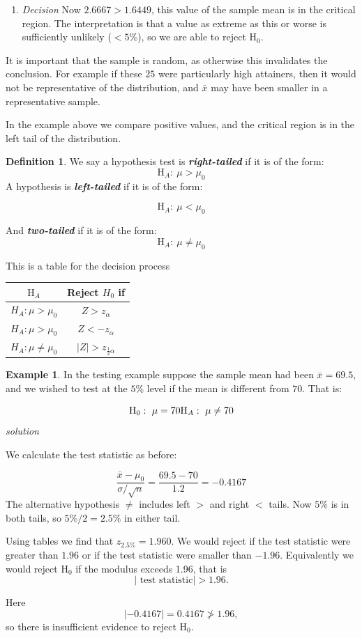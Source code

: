 \documentclass[
]{book}
\providecommand{\tightlist}{%
  \setlength{\itemsep}{0pt}\setlength{\parskip}{0pt}}
\theoremstyle{definition}
\newtheorem{definition}{Definition}[chapter]
\theoremstyle{definition}
\newtheorem{example}{Example}[chapter]
\theoremstyle{definition}
\theoremstyle{definition}
\theoremstyle{remark}
\begin{document}
\begin{enumerate}
\def\labelenumi{\arabic{enumi}.}
\setcounter{enumi}{2}
\tightlist
\item
  \emph{Decision}
  Now \(2.6667 > 1.6449\), this value of the sample mean is in the critical region. The interpretation is that a value as extreme as this or worse is sufficiently unlikely (\(<5\%\)), so we are able to reject \(\text{H}_{0}\).
\end{enumerate}

It is important that the sample is random, as otherwise this invalidates the conclusion. For example if these \(25\) were particularly high attainers, then it would not be representative of the distribution, and \(\bar{x}\) may have been smaller in a representative sample.

In the example above we compare positive values, and the critical region is in the left tail of the distribution.

\begin{definition}
We say a hypothesis test is \textbf{\emph{right-tailed}} if it is of the form:
\[\text{H}_A: \ \mu > \mu_0\]
A hypothesis is \textbf{\emph{left-tailed}} if it is of the form:

\[\text{H}_A: \ \mu < \mu_0\]

And \textbf{\emph{two-tailed}} if it is of the form:
\[\text{H}_A: \ \mu \neq \mu_0\]
\end{definition}

This is a table for the decision process

\begin{longtable}[]{@{}cc@{}}
\toprule
\(\text{H}_{A}\) & Reject \(H_{0}\) if\tabularnewline
\midrule
\endhead
\(H_{A}: \mu > \mu_0\) & \(Z>z_{\alpha}\)\tabularnewline
\(H_{A}: \mu > \mu_0\) & \(Z<-z_{\alpha}\)\tabularnewline
\(H_{A}: \mu \neq \mu_0\) & \(|Z|>z_{\frac{1}{2}\alpha}\)\tabularnewline
\bottomrule
\end{longtable}

\begin{example}
In the testing example suppose the sample mean had been \(\bar{x}=69.5\), and we wished to test at the \(5\%\) level if the mean is different from \(70\). That is:

\[\text{H}_0: \ \mu = 70 \\  \text{H}_A: \ \mu \neq 70\]
\emph{solution}

We calculate the test statistic as before:

\[\frac{\bar{x}-\mu_0}{\sigma / \sqrt{n}} =\frac{69.5-70}{1.2}=-0.4167  \]
The alternative hypothesis \(\neq\) includes left \(>\) and right \(<\) tails. Now \(5\%\) is in both tails, so \(5\% / 2 =2.5\%\) in either tail.

Using tables we find that \(z_{2.5\%} = 1.960\). We would reject if the test statistic were greater than \(1.96\) or if the test statistic were smaller than \(-1.96\). Equivalently we would reject \(\text{H}_0\) if the modulus exceeds 1.96, that is \[|\text{ test statistic}|>1.96.\]

Here
\[|-0.4167| = 0.4167 \ngtr 1.96,\]
so there is insufficient evidence to reject \(\text{H}_0\).
\end{example}
\end{document}

